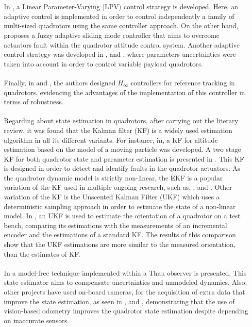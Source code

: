 \\\\
In \cite{Ameho2013}, a Linear Parameter-Varying (LPV) control strategy is developed. Here, an adaptive control is implemented in order to control independently a family of multi-sized quadrotors using the same controller approach. On the other hand, \cite{Gao2015} proposes a fuzzy adaptive sliding mode
controller that aims to overcome actuators fault within the quadrotor attitude control system. Another adaptive control strategy was developed in \cite{Wang2017a}, \cite{Emran2015} and \cite{Wang2017}, where parameters uncertainties were taken into account in order to control variable payload quadrotors.
\\\\
Finally, in \cite{Prayitno2016} and \cite{Ortiz2016}, the authors designed $H_{\infty}$ controllers for reference tracking in quadrotors, evidencing the advantages of the implementation of this controller in terms of robustness.
\\\\
Regarding about state estimation in quadrotors, after carrying out the literary review, it was found that the Kalman filter (KF) is a widely used estimation algorithm in all its different variants. For instance, in\cite{Munoz2017}, a KF for altitude estimation based on the model of a moving particle was developed. A two stage KF for both quadrotor state and parameter estimation is presented in \cite{Moghadam2015}. This KF is designed in order to detect and identify faults in the quadrotor actuators. As the quadrotor dynamic model is strictly non-linear, the EKF is a popular variation of the KF used in multiple ongoing research, such as\cite{Goodarzi2016}, \cite{Oh2015}, and \cite{Sebesta2014}. Other variation of the KF is the Unscented Kalman Filter (UKF) which uses a deterministic sampling approach in order to estimate the state of a non-linear model. In \cite{Goslinski2013}, an UKF is used to estimate the orientation of a quadrotor on a test bench, comparing its estimations with the measurements of an incremental encoder and the estimations of a standard KF. The results of this comparison show that the UKF estimations are more similar to the measured orientation, than the estimates of KF.
\\\\
In \cite{AlYounes2015} a model-free technique implemented within a Thau observer is presented. This state estimator aims to compensate uncertainties and unmodeled dynamics. Also, other projects have used on-board cameras, for the acquisition of extra data that improve the state estimation, as seen in \cite{Xie2016}, \cite{Yu2017} and \cite{Liu2017}, demonstrating that the use of vision-based odometry improves the quadrotor state estimation despite depending on inaccurate sensors.












